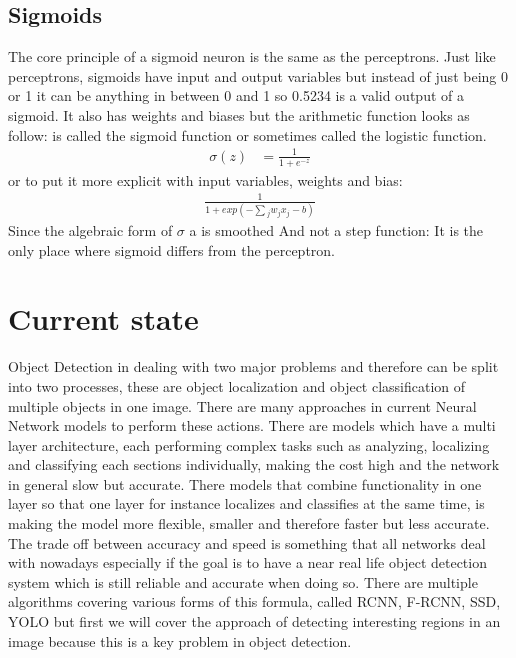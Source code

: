 \subsection{Sigmoids}
The core principle of a sigmoid neuron is the same as the perceptrons. Just like perceptrons, sigmoids have input and output variables but
instead of just being 0 or 1 it can be anything in between 0 and 1 so 0.5234 is a valid output of a sigmoid.
\newline
It also has weights and biases
but the arithmetic function looks as follow:
is called the sigmoid function or sometimes called the logistic function.
\begin{equation*}
    \begin{split}
        \sigma(z) & = \frac{1}{1+e^{-z}}
    \end{split}
\end{equation*}
or to put it more explicit with input variables, weights and bias:
\begin{equation*}
    \begin{split}
        \frac{1}{1+exp(-\sum{_j}{w_jx_j-b})}
    \end{split}
\end{equation*}
Since the algebraic form of {$\sigma$} a is smoothed 
And not a step function:
It is the only place where sigmoid differs from the perceptron.
\newpage

\section{Current state}
Object Detection in dealing with two major problems and therefore can be split into two processes, these are object localization and object classification of multiple objects in one image. There are many approaches in current Neural Network models to perform these actions.
There are models which have a multi layer architecture, each performing complex tasks such as analyzing, localizing and classifying each sections individually, making the cost high and the network in general slow but accurate.
There models that combine functionality in one layer so that one layer for instance localizes and classifies at the same time, is making the model more flexible, smaller and therefore faster but less accurate.
The trade off between accuracy and speed is something that all networks deal with nowadays especially if the goal is to have a near real life object
detection system which is still reliable and accurate when doing so.
\newline
There are multiple algorithms covering various forms of this formula, called RCNN, F-RCNN, SSD, YOLO but first we will cover the approach of
detecting interesting regions in an image because this is a key problem in object detection.

